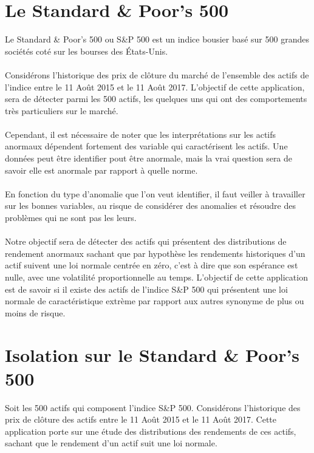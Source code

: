 \section{Le Standard \& Poor's 500}

Le Standard \& Poor's 500 ou S\&P 500 est un indice bousier basé sur 500 grandes sociétés coté sur les bourses des États-Unis.
\\
\\
Considérons l'historique des prix de clôture du marché de l'ensemble des actifs de l'indice entre le 11 Août 2015 et le  11 Août 2017. L'objectif de cette application, sera de détecter parmi les 500 actifs, les quelques uns qui ont des comportements très particuliers sur le marché.
\\
\\
Cependant, il est nécessaire de noter que les interprétations sur les actifs anormaux dépendent fortement des variable qui caractérisent les actifs. Une données peut être identifier pout être anormale, mais la vrai question sera de savoir elle est anormale par rapport à quelle norme.
\\
\\
En fonction du type d'anomalie que l'on veut identifier, il faut veiller à travailler sur les bonnes variables, au risque de considérer des anomalies et résoudre des problèmes qui ne sont pas les leurs.
\\
\\
Notre objectif sera de détecter des actifs qui présentent des distributions de rendement anormaux sachant que par hypothèse les rendements historiques d'un actif suivent une loi normale centrée en zéro, c'est à dire que son espérance est nulle, avec une volatilité proportionnelle au temps. L'objectif de cette application est de savoir si il existe des actifs de l'indice S\&P 500 qui présentent une loi normale de caractéristique extrème par rapport aux autres synonyme de plus ou moins de risque.

\section{Isolation sur le Standard \& Poor's 500}

Soit les 500 actifs qui composent l'indice S\&P 500. 
Considérons l'historique des prix de clôture des actifs entre le 11 Août 2015 et le  11 Août 2017.
Cette application porte sur une étude des distributions des rendements de ces actifs, sachant que le rendement d'un actif suit une loi normale. 

